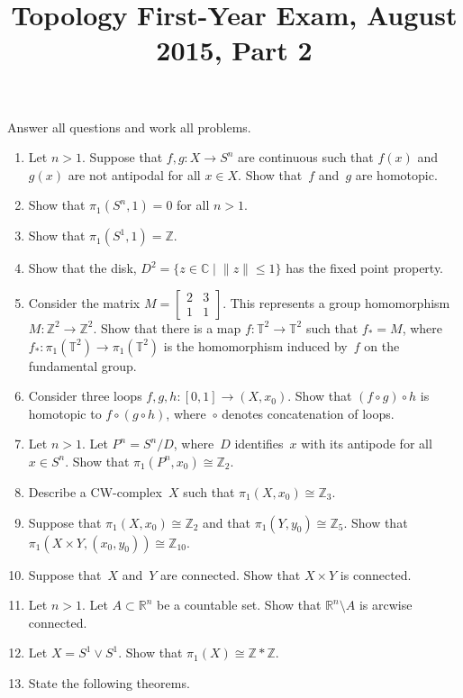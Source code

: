 \documentclass[11pt,letterpaper]{article}
\title{Topology First-Year Exam, August 2015, Part 2}
\author{}
\date{}
\newenvironment{examproblems}[2]{%
  \def\ProblemHeadingTag{#2}%
  \AssignTaggingSocketPlug{block/list/label}{examproblem}%
  \begin{enumerate}%
  \setcounter{enumi}{#1}%
  \renewcommand{\labelenumi}{\textbf{\theenumi.}}%
  \setlength{\topsep}{0.35em}%
  \setlength{\partopsep}{0pt}%
  \setlength{\itemsep}{0.48em}%
  \setlength{\parsep}{0.18em}%
}{\end{enumerate}}
\newenvironment{examinstructions}{%
  \par\begingroup\itshape
}{%
  \par\endgroup\vspace{0.18em}
}
\begin{document}
\maketitle
\thispagestyle{empty}
\begin{examinstructions}
Answer all questions and work all problems.
\end{examinstructions}
\begin{examproblems}{0}{H2}
\def\ProblemHeadingText{Problem 1.}
\item
Let \(n>1\). Suppose that \(f,g:X\to S^n\) are continuous such that \(f(x)\) and \(g(x)\) are not antipodal for all \(x\in X\). Show that~\(f\) and~\(g\) are homotopic.
\def\ProblemHeadingText{Problem 2.}
\item
Show that \(\pi_1(S^n,1)=0\) for all \(n>1\).
\def\ProblemHeadingText{Problem 3.}
\item
Show that \(\pi_1(S^1,1)=\mathbb{Z}\).
\def\ProblemHeadingText{Problem 4.}
\item
Show that the disk, \(D^2=\{z\in\mathbb{C}\mid \lVert z\rVert\leq 1\}\) has the fixed point property.
\def\ProblemHeadingText{Problem 5.}
\item
Consider the matrix \(M=\begin{bmatrix}2&3\\1&1\end{bmatrix}\). This represents a group homomorphism \(M:\mathbb{Z}^2\to\mathbb{Z}^2\). Show that there is a map \(f:\mathbb{T}^2\to\mathbb{T}^2\) such that \(f_*=M\), where \(f_*:\pi_1(\mathbb{T}^2)\to\pi_1(\mathbb{T}^2)\) is the homomorphism induced by~\(f\) on the fundamental group.
\def\ProblemHeadingText{Problem 6.}
\item
Consider three loops \(f,g,h:[0,1]\to(X,x_0)\). Show that \((f\circ g)\circ h\) is homotopic to \(f\circ(g\circ h)\), where~\(\circ\) denotes concatenation of loops.
\def\ProblemHeadingText{Problem 7.}
\item
Let \(n>1\). Let \(P^n=S^n/D\), where~\(D\) identifies~\(x\) with its antipode for all \(x\in S^n\). Show that \(\pi_1(P^n,x_0)\cong\mathbb{Z}_2\).
\def\ProblemHeadingText{Problem 8.}
\item
Describe a CW-complex~\(X\) such that \(\pi_1(X,x_0)\cong\mathbb{Z}_3\).
\def\ProblemHeadingText{Problem 9.}
\item
Suppose that \(\pi_1(X,x_0)\cong\mathbb{Z}_2\) and that \(\pi_1(Y,y_0)\cong\mathbb{Z}_5\). Show that \(\pi_1(X\times Y,(x_0,y_0))\cong\mathbb{Z}_{10}\).
\def\ProblemHeadingText{Problem 10.}
\item
Suppose that~\(X\) and~\(Y\) are connected. Show that \(X\times Y\) is connected.
\def\ProblemHeadingText{Problem 11.}
\item
Let \(n>1\). Let \(A\subset\mathbb{R}^n\) be a countable set. Show that \(\mathbb{R}^n\setminus A\) is arcwise connected.
\def\ProblemHeadingText{Problem 12.}
\item
Let \(X=S^1\vee S^1\). Show that \(\pi_1(X)\cong\mathbb{Z}*\mathbb{Z}\).
\def\ProblemHeadingText{Problem 13.}
\item
State the following theorems.


\end{examproblems}
\end{document}
